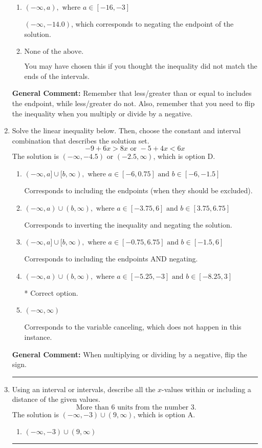 \documentclass{extbook}[14pt]
\newcommand{\litem}[1]{\item #1

\rule{\textwidth}{0.4pt}}
\begin{document}
\begin{enumerate}
{\begin{enumerate}[label=\Alph*.]
 $(14.0, \infty)$, which corresponds to switching the direction of the interval. You likely did this if you did not flip the inequality when dividing by a negative!
\item \( (-\infty, a), \text{ where } a \in [-16, -3] \)

 $(-\infty, -14.0)$, which corresponds to negating the endpoint of the solution.
\item \( \text{None of the above}. \)

You may have chosen this if you thought the inequality did not match the ends of the intervals.
\end{enumerate}

\textbf{General Comment:} Remember that less/greater than or equal to includes the endpoint, while less/greater do not. Also, remember that you need to flip the inequality when you multiply or divide by a negative.
}
\litem{
Solve the linear inequality below. Then, choose the constant and interval combination that describes the solution set.
\[ -9 + 6 x > 8 x \text{ or } -5 + 4 x < 6 x \]The solution is \( (-\infty, -4.5) \text{ or } (-2.5, \infty) \), which is option D.\begin{enumerate}[label=\Alph*.]
\item \( (-\infty, a] \cup [b, \infty), \text{ where } a \in [-6, 0.75] \text{ and } b \in [-6, -1.5] \)

Corresponds to including the endpoints (when they should be excluded).
\item \( (-\infty, a) \cup (b, \infty), \text{ where } a \in [-3.75, 6] \text{ and } b \in [3.75, 6.75] \)

Corresponds to inverting the inequality and negating the solution.
\item \( (-\infty, a] \cup [b, \infty), \text{ where } a \in [-0.75, 6.75] \text{ and } b \in [-1.5, 6] \)

Corresponds to including the endpoints AND negating.
\item \( (-\infty, a) \cup (b, \infty), \text{ where } a \in [-5.25, -3] \text{ and } b \in [-8.25, 3] \)

 * Correct option.
\item \( (-\infty, \infty) \)

Corresponds to the variable canceling, which does not happen in this instance.
\end{enumerate}

\textbf{General Comment:} When multiplying or dividing by a negative, flip the sign.
}
\litem{
Using an interval or intervals, describe all the $x$-values within or including a distance of the given values.
\[ \text{ More than } 6 \text{ units from the number } 3. \]The solution is \( (-\infty, -3) \cup (9, \infty) \), which is option A.\begin{enumerate}[label=\Alph*.]
\item \( (-\infty, -3) \cup (9, \infty) \)


\end{enumerate}}
\end{enumerate}
\end{document}
